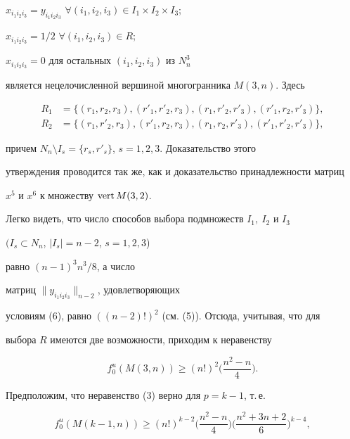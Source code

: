 $x_{i_1 i_2 i_3}=y_{i_1 i_2 i_3}$ $\forall (i_1,i_2,i_3)\in I_1\times I_2


\times I_3$;


$x_{i_1 i_2 i_3}=1/2$ $\forall (i_1,i_2,i_3)\in R$;


$x_{i_1 i_2 i_3}=0$ для остальных $(i_1,i_2,i_3)$ из $N^3_n$


является нецелочисленной вершиной многогранника $M(3,n)$. Здесь


\begin{align*}


R_1&=\{(r_1,r_2,r_3),(r'_1,r'_2,r_3),(r_1,r'_2,r'_3),


(r'_1,r_2,r'_3)\}, \\


%


R_2&=\{(r_1,r'_2,r_3),(r'_1,r_2,r_3),(r_1,r_2,r'_3),


(r'_1,r'_2,r'_3)\},


\end{align*}


причем $N_n\setminus I_s=\{r_s,r'_s\}$, $s=1,2,3$. Доказательство этого


утверждения проводится так же, как и доказательство принадлежности матриц


$x^5$ и $x^6$ к множеству $\operatorname{vert} M(3,2)$.





Легко видеть, что число способов выбора подмножеств $I_1,\ I_2$ и $I_3$


$(I_s\subset N_n$, $|I_s|=n-2$, $s=1,2,3$)


равно $(n-1)^3n^3/8$, а число 


матриц $\|y_{i_1 i_2 i_3}\|_{n-2}$, удовлетворяющих


условиям (6), равно $((n-2)!)^2$ (см. (5)). Отсюда, учитывая, что для


выбора $R$ имеются две возможности, приходим к неравенству


$$


f^u_0(M(3,n))\geq (n!)^2 \bigg(\frac{n^2-n}{4}\bigg).


$$





Предположим, что неравенство (3) верно для $p=k-1$, т.\,е.


\begin{equation}


f^u_0(M(k-1,n))\geq (n!)^{k-2}


\bigg(\frac{n^2-n}{4}\bigg)\bigg(\frac{n^2+3n+2}{6}\bigg)^{k-4}, 


\end{equation}



